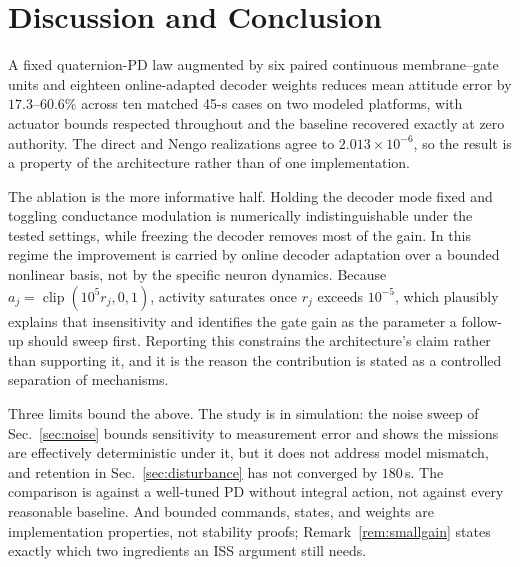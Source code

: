 \documentclass[letterpaper,10pt,conference]{IEEEtran}
\newcommand{\clip}{\operatorname{clip}}
\begin{document}
\section{Discussion and Conclusion}
\label{sec:conclusion}
A fixed quaternion-PD law augmented by six paired continuous membrane--gate
units and eighteen online-adapted decoder weights reduces mean attitude
error by $17.3$--$60.6\%$ across ten matched 45-s cases on two modeled
platforms, with actuator bounds respected throughout and the baseline
recovered exactly at zero authority. The direct and Nengo realizations agree
to $2.013\times10^{-6}$, so the result is a property of the architecture
rather than of one implementation.

The ablation is the more informative half. Holding the decoder mode fixed
and toggling conductance modulation is numerically indistinguishable under
the tested settings, while freezing the decoder removes most of the gain.
In this regime the improvement is carried by online decoder adaptation over
a bounded nonlinear basis, not by the specific neuron dynamics. Because
$a_j=\clip(10^5r_j,0,1)$, activity saturates once $r_j$ exceeds $10^{-5}$,
which plausibly explains that insensitivity and identifies the gate gain as
the parameter a follow-up should sweep first. Reporting this constrains the
architecture's claim rather than supporting it, and it is the reason the
contribution is stated as a controlled separation of mechanisms.

Three limits bound the above. The study is in simulation: the noise
sweep of Sec.~\ref{sec:noise} bounds sensitivity to measurement error and
shows the missions are effectively deterministic under it, but it does not
address model mismatch, and retention in Sec.~\ref{sec:disturbance} has not
converged by $180$\,s. The comparison is against a well-tuned PD without
integral action, not against every reasonable baseline. And bounded
commands, states, and weights are implementation properties, not stability
proofs; Remark~\ref{rem:smallgain} states exactly which two ingredients an
ISS argument still needs.
\end{document}
